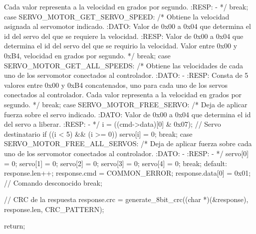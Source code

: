 {\begin{verbatimtab}
{{			Cada valor representa a la velocidad en grados por segundo.
			:RESP:
			-
			*/
		break;
 		case SERVO_MOTOR_GET_SERVO_SPEED:
			/* Obtiene la velocidad asignada al servomotor indicado.
			:DATO:
			Valor de 0x00 a 0x04 que determina el id del servo del que
			se requiere la velocidad.
			:RESP:
			Valor de 0x00 a 0x04 que determina el id del servo del que 
			se requirio la velocidad. Valor entre 0x00 y 0xB4, velocidad 
			en grados por segundo.
			*/
		break;
 		case SERVO_MOTOR_GET_ALL_SPEEDS:
			/* Obtiene las velocidades de cada uno de los servomotor 
			conectados al controlador.
			:DATO:
			-
			:RESP:
			Consta de 5 valores entre 0x00 y 0xB4 concatenados, uno para 
			cada uno de los servos conectados al controlador. Cada valor 
			representa a la velocidad en grados por segundo.
			*/
		break;
 		case SERVO_MOTOR_FREE_SERVO:
			/* Deja de aplicar fuerza sobre el servo indicado.
			:DATO:
			Valor de 0x00 a 0x04 que determina el id del servo a liberar.
			:RESP:
			-
			*/
			i = ((cmd->data)[0] & 0x07); // Servo destinatario
			if ((i < 5) && (i >= 0))
			{
				servo[i] = 0;
			}
		break;
 		case SERVO_MOTOR_FREE_ALL_SERVOS:
			/* Deja de aplicar fuerza sobre cada uno de los servomotor 
			conectados al controlador.
			:DATO:
			-
			:RESP:
			-
			*/
			servo[0] = 0;
			servo[1] = 0;
			servo[2] = 0;
			servo[3] = 0;
			servo[4] = 0;
		break;
		default:
			response.len++;
			response.cmd = COMMON_ERROR;
			response.data[0] = 0x01; // Comando desconocido
		break;
	}	

	// CRC de la respuesta
	response.crc = generate_8bit_crc((char *)(&response), response.len, CRC_PATTERN);

	return;
}
\end{verbatimtab}
}
